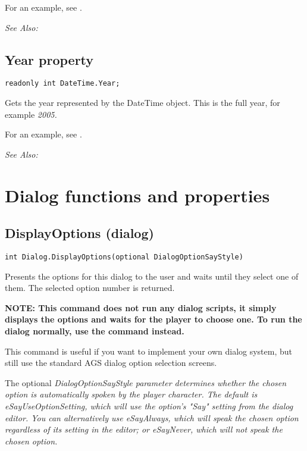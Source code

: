 For an example, see .

\it{See Also:} 


\subsection{Year property}\label{DateTime.Year}%

\begin{verbatim}
readonly int DateTime.Year;
\end{verbatim}
Gets the year represented by the DateTime object. This is the full year,
for example \it{2005}.

For an example, see .

\it{See Also:} 


\section{Dialog functions and properties}%


\subsection{DisplayOptions (dialog)}\label{Dialog.DisplayOptions}%

\begin{verbatim}
int Dialog.DisplayOptions(optional DialogOptionSayStyle)
\end{verbatim}
Presents the options for this dialog to the user and waits until they select
one of them. The selected option number is returned.

\bf{NOTE:} This command does not run any dialog scripts, it simply displays
the options and waits for the player to choose one.  To run the dialog normally,
use the  command instead.

This command is useful if you want to implement your own dialog system, but still
use the standard AGS dialog option selection screens.

The optional \it{DialogOptionSayStyle} parameter determines whether the chosen option
is automatically spoken by the player character. The default is \it{eSayUseOptionSetting},
which will use the option's "Say" setting from the dialog editor. You can alternatively
use \it{eSayAlways}, which will speak the chosen option regardless of its setting
in the editor; or \it{eSayNever}, which will not speak the chosen option.

